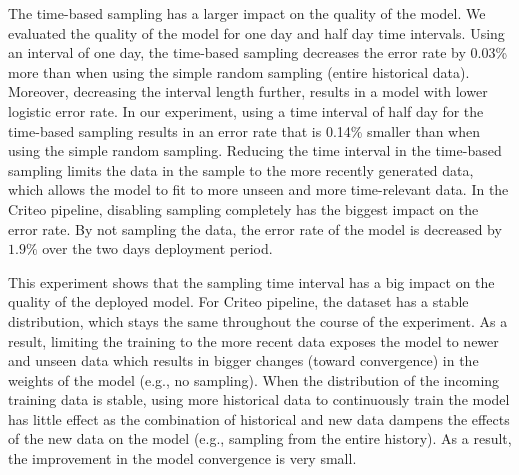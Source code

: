 \begin{figure}
\centering
\resizebox{\columnwidth}{!}{}
\end{figure}


The time-based sampling has a larger impact on the quality of the model.
We evaluated the quality of the model for one day and half day time intervals.
Using an interval of one day, the time-based sampling decreases the error rate by 0.03\%  more than when using the simple random sampling (entire historical data).
Moreover, decreasing the interval length further, results in a model with lower logistic error rate.
In our experiment, using a time interval of half day for the time-based sampling results in an error rate that is 0.14\% smaller than when using the simple random sampling. 
Reducing the time interval in the time-based sampling limits the data in the sample to the more recently generated data, which allows the model to fit to more unseen and more time-relevant data.
In the Criteo pipeline, disabling sampling completely has the biggest impact on the error rate.
By not sampling the data, the error rate of the model is decreased by $1.9\%$ over the two days deployment period.

This experiment shows that the sampling time interval has a big impact on the quality of the deployed model.
For Criteo pipeline, the dataset has a stable distribution, which stays the same throughout the course of the experiment.
As a result, limiting the training to the more recent data exposes the model to newer and unseen data which results in bigger changes (toward convergence) in the weights of the model (e.g., no sampling).
When the distribution of the incoming training data is stable, using more historical data to continuously train the model has little effect as the combination of historical and new data dampens the effects of the new data on the model (e.g., sampling from the entire history).
As a result, the improvement in the model convergence is very small.

